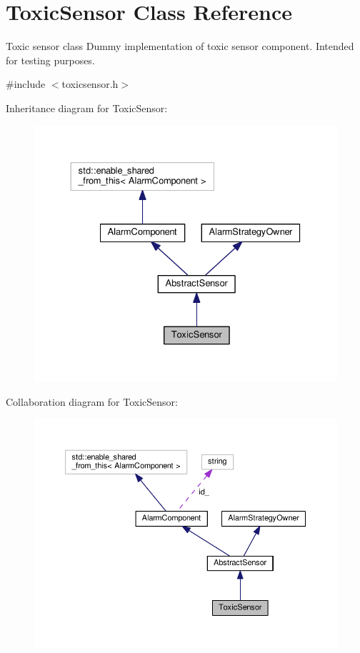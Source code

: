 \hypertarget{classToxicSensor}{}\section{Toxic\+Sensor Class Reference}
\label{classToxicSensor}


Toxic sensor class Dummy implementation of toxic sensor component. Intended for testing purposes.  




{\ttfamily \#include $<$toxicsensor.\+h$>$}



Inheritance diagram for Toxic\+Sensor\+:
\nopagebreak
\begin{figure}[H]
\begin{center}
\leavevmode
\includegraphics[width=330pt]{classToxicSensor__inherit__graph}
\end{center}
\end{figure}


Collaboration diagram for Toxic\+Sensor\+:
\nopagebreak
\begin{figure}[H]
\begin{center}
\leavevmode
\includegraphics[width=350pt]{classToxicSensor__coll__graph}
\end{center}
\end{figure}
